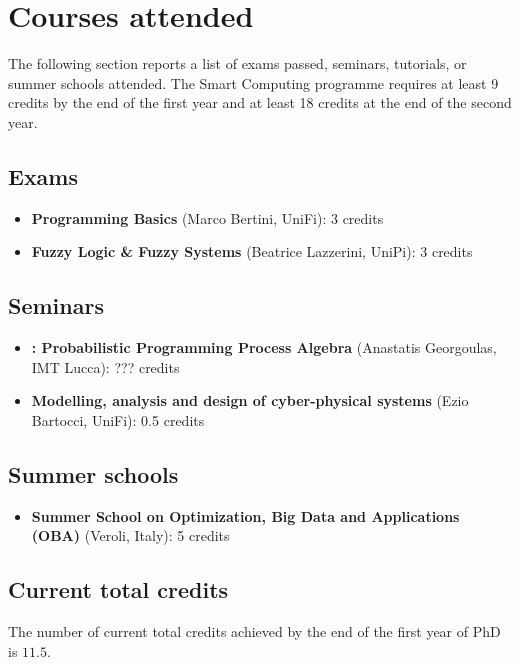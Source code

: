 
\section*{Courses attended}
  The following section reports a list of exams passed, seminars, tutorials, or summer schools attended. The Smart Computing  programme requires at least 9 credits by the end of the first year and at least 18 credits at the end of the second year.

  \subsection*{Exams}
  
    \begin{itemize}
      \item \textbf{ Programming Basics} (Marco Bertini, \ac{UniFi}): 3 credits
      \item \textbf{Fuzzy Logic \& Fuzzy Systems} (Beatrice Lazzerini, \ac{UniPi}): 3 credits
    \end{itemize}
    
  \subsection*{Seminars}
  
    \begin{itemize}
      \item \textbf{: Probabilistic Programming Process Algebra} (Anastatis Georgoulas, IMT Lucca): ??? credits
      \item \textbf{Modelling, analysis and design of cyber-physical systems} (Ezio Bartocci, UniFi): 0.5 credits
    \end{itemize}
    
  \subsection*{Summer schools}
  
    \begin{itemize}
      \item \textbf{Summer School on Optimization, Big Data and Applications (OBA)} (Veroli, Italy): 5 credits
    \end{itemize}
    
  \subsection*{Current total credits}
  
    The number of current total credits achieved by the end of the first year of \ac{PhD} is $11.5$.
    
\newpage
  